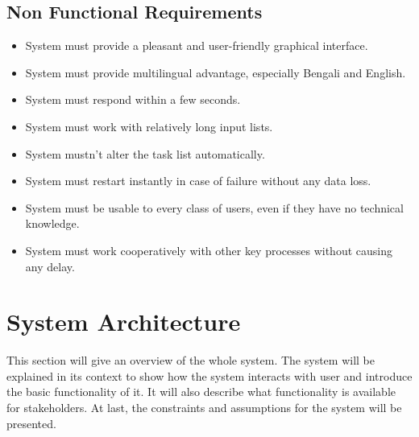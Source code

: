 \documentclass{scrreprt}
\begin{document}
\section {Non Functional Requirements}
\begin{itemize}
    \item System must provide a pleasant and user-friendly graphical interface.
    \item System must provide multilingual advantage, especially Bengali and English.
    \item System must respond within a few seconds.
    \item System must work with relatively long input lists.
    \item System mustn’t alter the task list automatically.
    \item System must restart instantly in case of failure without any data loss.
    \item System must be usable to every class of users, even if they have no technical knowledge.
    \item System must work cooperatively with other key processes without causing any delay.
\end{itemize}

\chapter {System Architecture}
This section will give an overview of the whole system. The system will be explained in its context
to show how the system interacts with user and introduce the basic functionality of it. It will also
describe what functionality is available for stakeholders. At last, the constraints and assumptions for
the system will be presented.
\end{document}
